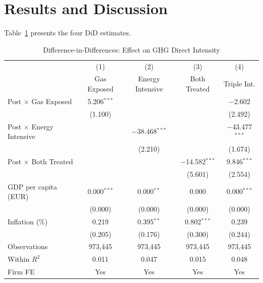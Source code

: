 \documentclass[authoryear,preprint,review,12pt]{elsarticle}
\begin{document}
\section{Results and Discussion}
\label{sec:results}

Table~\ref{tab:did} presents the four DiD estimates.

\begin{table}[H]
\centering
\small
\caption{Difference-in-Differences: Effect on GHG Direct Intensity}
\label{tab:did}
\begin{tabular}{lcccc}
\toprule
 & (1) & (2) & (3) & (4) \\
 & Gas Exposed & Energy Intensive & Both Treated & Triple Int. \\
\midrule
Post $\times$ Gas Exposed         & 5.206$^{***}$ &               &                & $-$2.602 \\
                                   & (1.100)        &               &                & (2.492) \\[2pt]
Post $\times$ Energy Intensive    &               & $-$38.468$^{***}$ &            & $-$43.477$^{***}$ \\
                                   &               & (2.210)           &            & (1.674) \\[2pt]
Post $\times$ Both Treated        &               &               & $-$14.582$^{***}$ & 9.846$^{***}$ \\
                                   &               &               & (5.601)           & (2.554) \\[2pt]
GDP per capita (EUR)               & 0.000$^{***}$ & 0.000$^{**}$  & 0.000          & 0.000$^{***}$ \\
                                   & (0.000)       & (0.000)       & (0.000)        & (0.000) \\[2pt]
Inflation (\%)                    & 0.219         & 0.395$^{**}$  & 0.802$^{***}$  & 0.239 \\
                                   & (0.205)       & (0.176)       & (0.300)        & (0.244) \\[2pt]
\midrule
Observations   & 973,445 & 973,445 & 973,445 & 973,445 \\
Within $R^2$   & 0.011   & 0.047   & 0.015   & 0.048 \\
Firm FE        & Yes     & Yes     & Yes     & Yes \\

\end{tabular}
\end{table}
\end{document}
